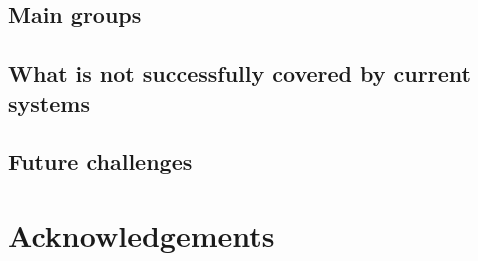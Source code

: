 \documentclass[a4paper]{article}
\begin{document}
\subsection{Main groups}

\subsection{What is not successfully covered by current systems}

\subsection{Future challenges}
\label{sect|future-challenges}

\section*{Acknowledgements} 




\end{document}
